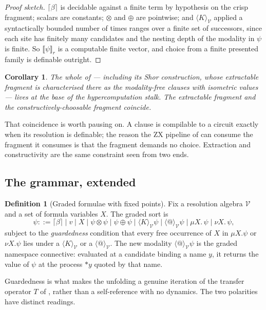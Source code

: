 \documentclass[11pt]{article}
\theoremstyle{definition}
\newtheorem{definition}{Definition}
\theoremstyle{plain}
\newtheorem{corollary}{Corollary}
\theoremstyle{remark}
\newcommand{\V}{\mathcal{V}}
\newcommand{\sumv}{\oplus}
\newcommand{\tensorv}{\otimes}
\newcommand{\sem}[1]{\llbracket #1 \rrbracket}
\newcommand{\crisp}[1]{\lceil #1 \rceil}
\begin{document}
\begin{proof}[Proof sketch]
$\crisp{\beta}$ is decidable against a finite term by hypothesis on the crisp fragment;
scalars are constants; $\tensorv$ and $\sumv$ are pointwise; and
$\langle K \rangle_\V$ applied a syntactically bounded number of times ranges over a
finite set of successors, since each site has finitely many candidates and the nesting
depth of the modality in $\psi$ is finite. So $\sem{\psi}_r$ is a computable finite
vector, and choice from a finite presented family is definable outright.
\end{proof}

\begin{corollary}
The whole of \cite{gradedwhere} --- including its Shor construction, whose extractable
fragment is characterised there as the modality-free clauses with isometric values ---
lives at the base of the hypercomputation stalk. The extractable fragment and the
constructively-choosable fragment coincide.
\end{corollary}

That coincidence is worth pausing on. A clause is compilable to a circuit exactly when
its resolution is definable; the reason the ZX pipeline of \cite{cwrhozx} can consume
the fragment it consumes is that the fragment demands no choice. Extraction and
constructivity are the same constraint seen from two ends.

\subsection{The grammar, extended}

\begin{definition}[Graded formulae with fixed points]\label{def:grammar}
Fix a resolution algebra $\V$ and a set of formula variables $X$. The graded sort is
\[
  \psi ::= \crisp{\beta} \mid v \mid X \mid \psi \tensorv \psi \mid \psi \sumv \psi
  \mid \langle K \rangle_\V \psi \mid \langle @ \rangle_\V \psi
  \mid \mu X.\,\psi \mid \nu X.\,\psi ,
\]
subject to the \emph{guardedness} condition that every free occurrence of $X$ in
$\mu X.\psi$ or $\nu X.\psi$ lies under a $\langle K \rangle_\V$ or a
$\langle @ \rangle_\V$. The new modality $\langle @ \rangle_\V \psi$ is the graded
namespace connective: evaluated at a candidate binding a name $y$, it returns the value
of $\psi$ at the process $*y$ quoted by that name.
\end{definition}

Guardedness is what makes the unfolding a genuine iteration of the transfer operator
$T$ of \cite{gradedwhere}, rather than a self-reference with no dynamics. The two
polarities have distinct readings.
\end{document}
